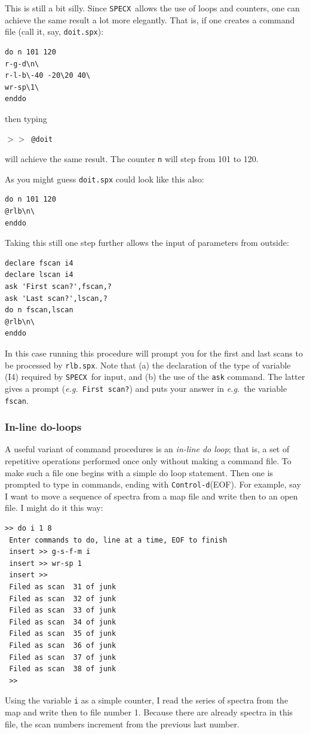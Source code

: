 \documentclass[11pt,twoside]{article}
\newcommand{\eg}{{\it e.g.}}
\newcommand{\SPECX}{{\tt SPECX}}
\newcommand{\SP}{{$>\!>$}}
\newcommand{\ctrld}{{\tt Control-d}}
\begin{document}
This is still a bit silly. Since \SPECX\ allows the use of loops and
counters, one can achieve the same result a lot more elegantly. That
is, if one creates a command file (call it, say, {\tt doit.spx}):

\begin{verbatim}
do n 101 120
r-g-d\n\
r-l-b\-40 -20\20 40\
wr-sp\1\
enddo
\end{verbatim}

then typing

\SP\ \verb|@doit|

will achieve the same result. The counter {\tt n} will step from 101
to 120.

As you might guess {\tt doit.spx} could look like this also:

\begin{verbatim}
do n 101 120
@rlb\n\
enddo
\end{verbatim}

Taking this still one step further allows the input of parameters from
outside:

\begin{verbatim}
declare fscan i4
declare lscan i4
ask 'First scan?',fscan,?
ask 'Last scan?',lscan,?
do n fscan,lscan
@rlb\n\
enddo
\end{verbatim}

In this case running this procedure will prompt you for the first and
last scans to be processed by {\tt rlb.spx}. Note that (a) the
declaration of the type of variable (I4) required by \SPECX\ for
input, and (b) the use of the {\tt ask} command. The latter gives a
prompt (\eg\ {\tt First scan?}) and puts your answer in \eg\ the
variable {\tt fscan}.

\subsubsection{In-line do-loops}
\label{sec:do-loops}
A useful variant of command procedures is an {\it in-line do loop};
that is, a set of repetitive operations performed once only without
making a command file. To make such a file one begins with a simple do
loop statement. Then one is prompted to type in commands, ending with
\ctrld (EOF). For example, say I want to move a sequence of spectra
from a map file and write then to an open file. I might do it this
way:
\begin{verbatim}
>> do i 1 8
 Enter commands to do, line at a time, EOF to finish
 insert >> g-s-f-m i
 insert >> wr-sp 1
 insert >>
 Filed as scan  31 of junk
 Filed as scan  32 of junk
 Filed as scan  33 of junk
 Filed as scan  34 of junk
 Filed as scan  35 of junk
 Filed as scan  36 of junk
 Filed as scan  37 of junk
 Filed as scan  38 of junk
 >>
\end{verbatim}
Using the variable {\tt i} as a simple counter, I read the series of
spectra from the map and write then to file number 1. Because there
are already spectra in this file, the scan numbers increment from the
previous last number.
\end{document}
